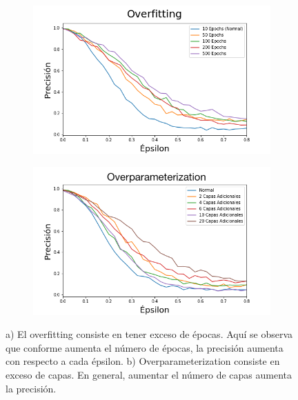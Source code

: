 \begin{figure}[h]
    \centering
    \begin{subfigure}[b]{0.49\textwidth}
        \centering
        \includegraphics[width=\textwidth]{images/overfit_vs_attack.png}
        \caption{}
        \label{overfit}
    \end{subfigure}
    \begin{subfigure}[b]{0.49\textwidth}
        \centering
        \includegraphics[width=\textwidth]{images/overparam_vs_attack.png}
        \caption{}
        \label{overparam}
    \end{subfigure}
    \caption{a) El overfitting consiste en tener exceso de épocas. Aquí se observa que conforme aumenta el número de épocas, la precisión aumenta con respecto a cada épsilon. b) Overparameterization consiste en exceso de capas. En general, aumentar el número de capas aumenta la precisión.}
    \label{overaparam_overfit}
\end{figure}

